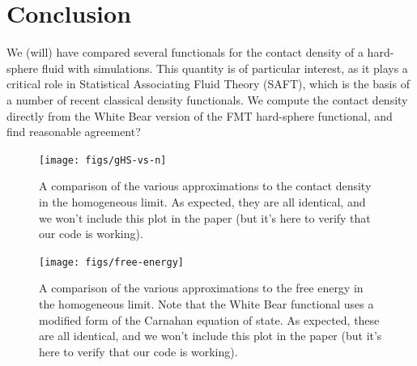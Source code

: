 \documentclass[letterpaper,twocolumn,amsmath,amssymb,jcp,10pt,aip]{revtex4-1}
\begin{document}
\section{Conclusion}
We (will) have compared several functionals for the contact density of
a hard-sphere fluid with simulations.  This quantity is of particular
interest, as it plays a critical role in Statistical Associating Fluid
Theory (SAFT), which is the basis of a number of recent classical
density functionals.  We compute the contact density directly from the
White Bear version of the FMT hard-sphere functional, and find
reasonable agreement?

\appendix

\begin{figure}
\texttt{[image: figs/gHS-vs-n]}
\caption{A comparison of the various approximations to the contact
  density in the homogeneous limit.  As expected, they are all
  identical, and we won't include this plot in the paper (but it's
  here to verify that our code is working).}
\label{fig:gHS-vs-n}
\end{figure}

\begin{figure}
\texttt{[image: figs/free-energy]}
\caption{A comparison of the various approximations to the free energy
  in the homogeneous limit.  Note that the White Bear functional uses
  a modified form of the Carnahan equation of state.  As expected,
  these are all identical, and we won't include this plot in the paper
  (but it's here to verify that our code is working).}
\label{fig:free-energy}
\end{figure}
\end{document}
